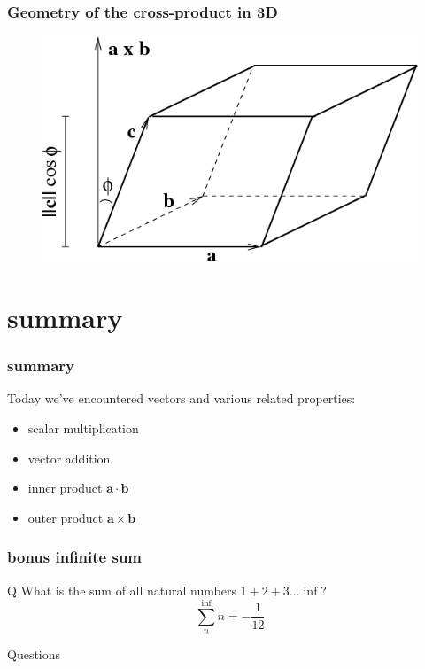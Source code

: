 \documentclass{beamer}
\begin{document}
\begin{frame}
\frametitle{Geometry of the cross-product in 3D}
\begin{figure}[htbp]
\begin{center}
 \includegraphics[width=\textwidth]{volume_parallelepiped.png}
\caption{}
\end{center}
\end{figure}

\end{frame}

\section{summary}
\begin{frame}
\frametitle{summary}
Today we've encountered vectors and various related properties:
\begin{itemize}
\item scalar multiplication
\item vector addition
\item inner product  $\mathbf{a} \cdot  \mathbf{b}$
\item outer product $\mathbf{a} \times \mathbf{b}$
\end{itemize}

\end{frame}

\begin{frame}
\frametitle{bonus infinite sum}
\begin{block}{Q}
What is the sum of all natural numbers $1+2+3 ... \inf$?
$$\sum_n^{\inf}n = - \frac{1}{12}$$
\end{block}
\end{frame}



\begin{frame}
\Huge{\centerline{Questions}}
\end{frame}
\end{document}
